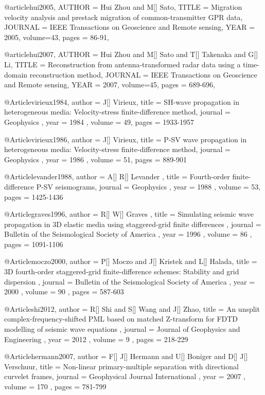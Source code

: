 @article{hui2005,
  AUTHOR =       {Hui Zhou and M[] Sato},
  TITLE =        {Migration velocity analysis and prestack migration of common-transmitter GPR data},
  JOURNAL =      {IEEE Transactions on Geoscience and Remote sensing},
  YEAR =         {2005},
  volume=43,
  pages = {86-91},
}

@article{hui2007,
  AUTHOR =       {Hui Zhou and M[] Sato and T[] Takenaka and G[] Li},
  TITLE =        {Reconstruction from antenna-transformed radar data using a time-domain reconstruction method},
  JOURNAL =      {IEEE Transactions on Geoscience and Remote sensing},
  YEAR =         {2007},
  volume=45,
  pages = {689-696},
}

@Article{virieux1984,
 author =  { J[] Virieux},
 title =   { SH-wave propagation in heterogeneous media: Velocity-stress finite-difference method},
 journal = { Geophysics },
 year =    { 1984 },
 volume =  { 49},
 pages =   { 1933-1957 }
}

@Article{virieux1986,
 author =  { J[] Virieux},
 title =   { P-SV wave propagation in heterogeneous media: Velocity-stress finite-difference method},
 journal = { Geophysics },
 year =    { 1986 },
 volume =  { 51},
 pages =   { 889-901 }
}

@Article{levander1988,
 author =  { A[] R[] Levander },
 title =   { Fourth-order finite-difference P-SV seismograms},
 journal = { Geophysics },
 year =    { 1988 },
 volume =  { 53},
 pages =   { 1425-1436 }
}

@Article{graves1996,
 author =  { R[] W[] Graves },
 title =   { Simulating seismic wave propagation in 3{D} elastic media using staggered-grid finite differences },
 journal = { Bulletin of the Seismological Society of America },
 year =    { 1996 },
 volume =  { 86 },
 pages =   { 1091-1106 }
}

@Article{moczo2000,
 author =  {  P[] Moczo and J[] Kristek and L[] Halada},
 title =   { 3{D} fourth-order staggered-grid finite-difference schemes: Stability and grid dispersion },
 journal = { Bulletin of the Seismological Society of America },
 year =    { 2000 },
 volume =  { 90 },
 pages =   { 587-603 }
}


@Article{shi2012,
 author =  {  R[] Shi and S[] Wang and J[] Zhao},
 title =   {An unsplit complex-frequency-shifted PML based on matched Z-transform for FDTD modelling of seismic wave equations },
 journal = { Journal of Geophysics and Engineering },
 year =    { 2012 },
 volume =  { 9 },
 pages =   { 218-229 }
}

@Article{hermann2007,
 author =  {  F[] J[] Hermann and U[] Boniger and D[] J[] Verschuur},
 title =   {Non-linear primary-multiple separation with directional curvelet frames},
 journal = { Geophysical Journal International },
 year =    { 2007 },
 volume =  { 170 },
 pages =   { 781-799 }
}

